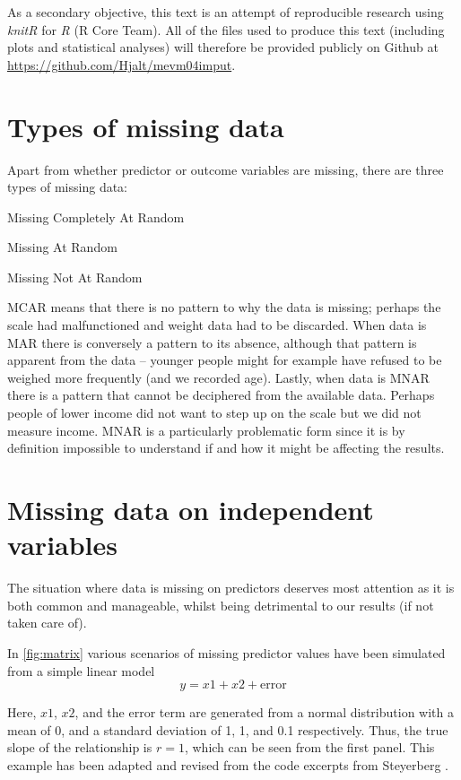 \documentclass[headinclude=true, headsepline=true, DIV14]{scrartcl}\usepackage[]{graphicx}\usepackage[]{color}
\begin{document}
As a secondary objective, this text is an attempt of reproducible research using
\emph{knitR} for \emph{R} (R Core Team). All of the files used to produce this
text (including plots and statistical analyses) will therefore be provided
publicly on Github at
\href{https://github.com/Hjalt/mevm04imput}{https://github.com/Hjalt/mevm04imput}.

\section{Types of missing data}

Apart from whether predictor or outcome variables are missing, there are 
three types of missing data:

\begin{description}[style=multiline,leftmargin=8ex]
  \item[MCAR] Missing Completely At Random
  \item[MAR] Missing At Random
  \item[MNAR] Missing Not At Random
\end{description}

MCAR means that there is no pattern to why the data is missing; perhaps the 
scale had malfunctioned and weight data had to be discarded. When data is MAR
there is conversely a pattern to its absence, although that pattern is apparent
from the data -- younger people might for example have refused to be weighed more
frequently (and we recorded age). Lastly,
when data is MNAR there is a pattern that cannot be deciphered from
the available data. Perhaps people of lower income did not want to step up on
the scale but we did not measure income. MNAR is a particularly problematic form
since it is by definition impossible to understand if and how it might be
affecting the results.

\section{Missing data on independent variables}

The situation where data is missing on predictors deserves most
attention as it is both common and manageable, whilst being detrimental to our
results (if not taken care of).

In \autoref{fig:matrix} various scenarios of missing predictor values
have been simulated from a simple linear model \[y=x1+x2+\text{error}\]

Here, $x1$, $x2$, and the error term are generated from a normal distribution
with a mean of 0, and a standard deviation of 1, 1, and 0.1 respectively. Thus,
the true slope of the relationship is $r=1$, which can be seen from the first
panel. This example has been adapted and revised from the code excerpts from
Steyerberg \cite{steyerberg_clinical_2009}.
\end{document}
